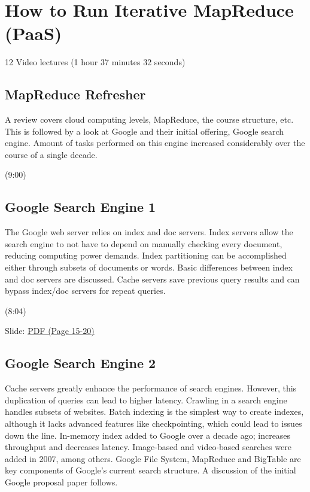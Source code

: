 \section{How to Run Iterative MapReduce
(PaaS)}




  12 Video lectures (1 hour 37 minutes 32 seconds)


\subsection{MapReduce Refresher}

A review covers cloud computing levels, MapReduce, the course structure,
etc. This is followed by a look at Google and their initial offering,
Google search engine. Amount of tasks performed on this engine increased
considerably over the course of a single decade.




  (9:00)


\subsection{Google Search Engine 1}

The Google web server relies on index and doc servers. Index servers
allow the search engine to not have to depend on manually checking every
document, reducing computing power demands. Index partitioning can be
accomplished either through subsets of documents or words. Basic
differences between index and doc servers are discussed. Cache servers
save previous query results and can bypass index/doc servers for repeat
queries.




  (8:04)





  Slide:
  \href{https://drive.google.com/open?id=0B88HKpainTSfYWZ0dDlrNThkVms}{PDF
  (Page 15-20)}


\subsection{Google Search Engine 2}

Cache servers greatly enhance the performance of search engines.
However, this duplication of queries can lead to higher latency.
Crawling in a search engine handles subsets of websites. Batch indexing
is the simplest way to create indexes, although it lacks advanced
features like checkpointing, which could lead to issues down the line.
In-memory index added to Google over a decade ago; increases throughput
and decreases latency. Image-based and video-based searches were added
in 2007, among others. Google File System, MapReduce and BigTable are
key components of Google's current search structure. A discussion of the
initial Google proposal paper follows.




